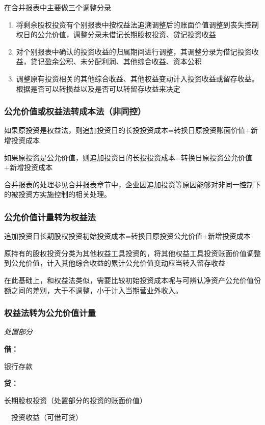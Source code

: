 \documentclass[UTF8,12pt]{ctexart}
\newenvironment{Dr}{%
	\begin{list}{}%
		{
			\setlength{\leftmargin}{2em}
			\setlength{\labelwidth}{2em}
			\setlength{\labelsep}{0pt}
			\setlength{\itemindent}{0pt}
			\setlength{\listparindent}{0pt}
			\setlength{\parsep}{0pt}
			\setlength{\topsep}{0pt}
		}
		\item[\textbf{借：}]
	}{%
	\end{list}
}
\newenvironment{Cr}{%
	\begin{list}{}%
		{
			\setlength{\leftmargin}{2em}
			\setlength{\labelwidth}{2em}
			\setlength{\labelsep}{0pt}
			\setlength{\itemindent}{0pt}
			\setlength{\listparindent}{0pt}
			\setlength{\parsep}{0pt}
			\setlength{\topsep}{0pt}
		}
		\item[\textbf{贷：}]
	}{%
	\end{list}
}
\numberwithin{equation}{section} %
\numberwithin{figure}{section}
\numberwithin{table}{section}
\begin{document}
	在合并报表中主要做三个调整分录
	\begin{enumerate}
		\item 将剩余股权投资有个别报表中按权益法追溯调整后的账面价值调整到丧失控制权日的公允价值，调整分录未借记长期股权投资、贷记投资收益
		
		\item 对个别报表中确认的投资收益的归属期间进行调整，其调整分录为借记投资收益，贷记盈余公积、未分配利润、其他综合收益、资本公积
		
		\item 调整原有投资相关的其他综合收益、其他权益变动计入投资收益或留存收益。根据是否可以转损益以及是否可以转留存收益来决定
	\end{enumerate}
	
	\subsubsection{公允价值或权益法转成本法（非同控）}
	如果原投资是权益法，则追加投资日的长投投资成本=转换日原投资账面价值+新增投资成本
	
	如果原投资是公允价值，则追加投资日的长投投资成本=转换日原投资公允价值+新增投资成本
	
	合并报表的处理参见合并报表章节中，企业因追加投资等原因能够对非同一控制下的被投资方实施控制的相关处理。
	
	\subsubsection{公允价值计量转为权益法}
	
	追加投资日长期股权投资初始投资成本=转换日原投资公允价值+新增投资成本
	
	原持有的股权投资分类为其他权益工具投资的，将其他权益工具投资账面价值调整到公允价值，计入其他综合收益的累计公允价值变动应当转入留存收益
	
	在此基础上，和权益法类似，需要比较初始投资成本呢与可辨认净资产公允价值份额之间的差别，大于不调整，小于计入当期营业外收入。
	
	\subsubsection{权益法转为公允价值计量}
	\textit{处置部分}
	
	\begin{Dr}
		银行存款
	\end{Dr}
	\begin{Cr}
		长期股权投资（处置部分的投资的账面价值）
		
		\ \ 投资收益（可借可贷）
	\end{Cr}
	
\end{document}
